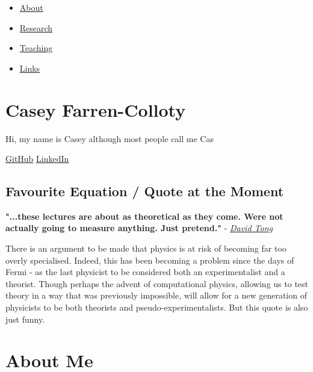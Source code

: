\documentclass{article}
\title{}
\author{Casey Farren-Colloty (21365022)}
\date{}
\begin{document}
\maketitle

\begin{itemize}
\item
  \hyperref[about]{About}
\item
  \hyperref[research]{Research}
\item
  \hyperref[teaching]{Teaching}
\item
  \hyperref[links]{Links}
\end{itemize}

\section{Casey Farren-Colloty}\label{casey-farren-colloty}

Hi, my name is Casey although most people call me {Cas}

\href{https://github.com/yourusername}{{GitHub}}
\href{https://linkedin.com/in/yourusername}{{LinkedIn}}

\label{featured}
\subsection{Favourite Equation / Quote at the
Moment}\label{favourite-equation-quote-at-the-moment}

\label{equation}
\textbf{"...these lectures are about as theoretical as they come.
We\textquotesingle re not actually going to measure anything. Just
pretend."} -
\emph{\href{http://www.damtp.cam.ac.uk/user/tong/qhe/qhe.pdf}{David
Tong}}

There is an argument to be made that physics is at risk of becoming far
too overly specialised. Indeed, this has been becoming a problem since
the days of Fermi - as the last physicist to be considered both an
experimentalist and a theorist. Though perhaps the advent of
computational physics, allowing us to test theory in a way that was
previously impossible, will allow for a new generation of physicists to
be both theorists and pseudo-experimentalists. But this quote is also
just funny.

\label{about}
\section{About Me}\label{about-me}
\end{document}
